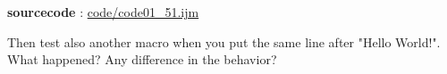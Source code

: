 \textbf{sourcecode} : \href{http://www.example.com/contents}{code/code01\_51.ijm}

Then test also another macro when you put the same line after "Hello World!". 
What happened? Any difference in the behavior? 
\item